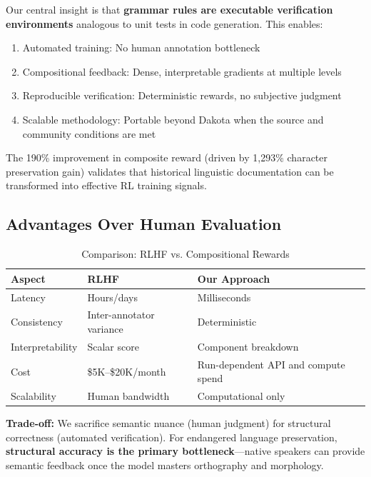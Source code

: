 \documentclass{article}
\begin{document}
Our central insight is that \textbf{grammar rules are executable verification environments} analogous to unit tests in code generation. This enables:

\begin{enumerate}
    \item Automated training: No human annotation bottleneck
    \item Compositional feedback: Dense, interpretable gradients at multiple levels
    \item Reproducible verification: Deterministic rewards, no subjective judgment
    \item Scalable methodology: Portable beyond Dakota when the source and community conditions are met
\end{enumerate}

The 190\% improvement in composite reward (driven by 1,293\% character preservation gain) validates that historical linguistic documentation can be transformed into effective RL training signals.

\subsection{Advantages Over Human Evaluation}

\begin{table}[t]
\centering
\caption{Comparison: RLHF vs. Compositional Rewards}
\label{tab:rlhf_comparison}
\small
\begin{tabular}{lll}
\toprule
\textbf{Aspect} & \textbf{RLHF} & \textbf{Our Approach} \\
\midrule
Latency & Hours/days & Milliseconds \\
Consistency & Inter-annotator variance & Deterministic \\
Interpretability & Scalar score & Component breakdown \\
Cost & \$5K--\$20K/month & Run-dependent API and compute spend \\
Scalability & Human bandwidth & Computational only \\
\bottomrule
\end{tabular}
\end{table}

\textbf{Trade-off:} We sacrifice semantic nuance (human judgment) for structural correctness (automated verification). For endangered language preservation, \textbf{structural accuracy is the primary bottleneck}---native speakers can provide semantic feedback once the model masters orthography and morphology.
\end{document}
